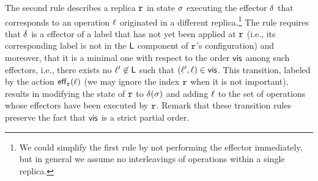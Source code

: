 The second rule describes a replica $\mathtt{r}$ in state $\sigma$
executing the effector $\delta$ that corresponds to an operation
$\ell$ originated in a different replica.\footnote{We could
  simplify the first rule by not performing the effector immediately,
  but in general we assume no interleavings of operations within a
  single replica.}
The rule requires that $\delta$ is a effector of a label that has
not yet been applied at $\mathtt{r}$ (i.e., its corresponding label is not
in the $\mathsf{L}$ component of $\mathtt{r}$'s configuration) and
moreover, that it is a minimal one with respect to the order
$\mathsf{vis}$ among such effectors, i.e., there exists no
$\ell'\not\in \mathsf{L}$ such that $(\ell',\ell)\in
\mathsf{vis}$.
This transition, labeled by the action $\mathsf{eff}_{\mathtt{r}}(\ell)$ (we may
ignore the index $\mathtt{r}$ when it is not important), results in
modifying the state of $\mathtt{r}$ to $\delta(\sigma)$ and adding
$\ell$ to the set of operations whose effectors have been
executed by $\mathtt{r}$.
Remark that these transition rules preserve the fact that $\mathsf{vis}$
is a strict partial order.
%





